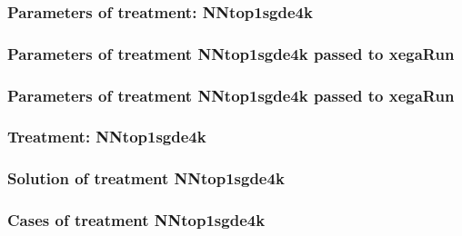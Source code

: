 \documentclass[18pt,c]{beamer}
\begin{document}
 \begin{frame}
 \fontsize{8pt}{9pt}\selectfont
 \frametitle{  Parameters of treatment: NNtop1sgde4k 
 }

 \label{ExpDtParmTable021.tex}  
 \end{frame}


 \begin{frame}
 \fontsize{8pt}{9pt}\selectfont
 \frametitle{  Parameters of treatment NNtop1sgde4k passed to xegaRun
 }

 \label{ExpDtParmTable022.tex}  
 \end{frame}


 \begin{frame}
 \fontsize{8pt}{9pt}\selectfont
 \frametitle{  Parameters of treatment NNtop1sgde4k passed to xegaRun
 }

 \label{ExpDtParmTable023.tex}  
 \end{frame}

 \begin{frame}
 \fontsize{8pt}{9pt}\selectfont
 \frametitle{ Treatment: NNtop1sgde4k }

 \label{ExpDStatsTable010.tex}  
 \end{frame}

 \begin{frame}
 \fontsize{8pt}{9pt}\selectfont
 \frametitle{ Solution of treatment NNtop1sgde4k }

 \label{ExpDSolutionTable021.tex}  
 \end{frame}

 \begin{frame}
 \fontsize{8pt}{9pt}\selectfont
 \frametitle{ Cases of treatment NNtop1sgde4k }

 \label{ExpDSolutionTable022.tex}  
 \end{frame}
\end{document}
